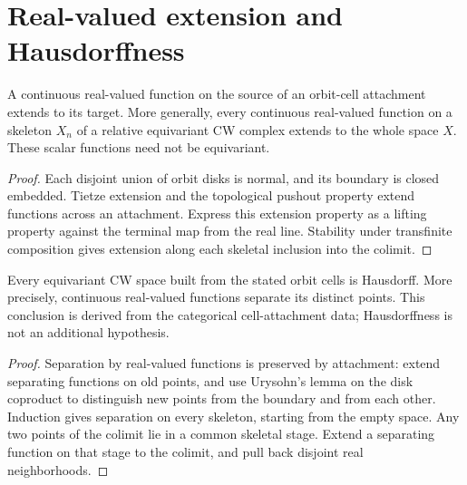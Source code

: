 \section{Real-valued extension and Hausdorffness}

\begin{proposition}\label{prop:cellular-real-extension}
\leanok
A continuous real-valued function on the source of an orbit-cell attachment
extends to its target. More generally, every continuous real-valued function
on a skeleton $X_n$ of a relative equivariant CW complex extends to the
whole space $X$. These scalar functions need not be equivariant.
\end{proposition}
\begin{proof}
\leanok
Each disjoint union of orbit disks is normal, and its boundary is closed
embedded. Tietze extension and the topological pushout property extend
functions across an attachment. Express this extension property as a
lifting property against the terminal map from the real line. Stability
under transfinite composition gives extension along each skeletal
inclusion into the colimit.
\end{proof}

\begin{proposition}\label{prop:equivariant-cw-hausdorff}
\leanok
Every equivariant CW space built from the stated orbit cells is Hausdorff.
More precisely, continuous real-valued functions separate its distinct
points. This conclusion is derived from the categorical cell-attachment
data; Hausdorffness is not an additional hypothesis.
\end{proposition}
\begin{proof}
\leanok
Separation by real-valued functions is preserved by attachment: extend
separating functions on old points, and use Urysohn's lemma on the disk
coproduct to distinguish new points from the boundary and from each other.
Induction gives separation on every skeleton, starting from the empty
space. Any two points of the colimit lie in a common skeletal stage.
Extend a separating function on that stage to the colimit, and pull back
disjoint real neighborhoods.
\end{proof}

